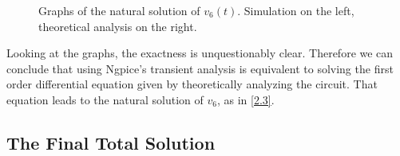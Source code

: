 \begin{figure}[h]
  \caption{\small Graphs of the natural solution of $v_6(t)$. Simulation on the left, theoretical analysis on the right.}
  \label{maquina}
\end{figure}

Looking at the graphs, the exactness is unquestionably clear. Therefore we can conclude that using Ngpice’s transient analysis is equivalent
to solving the first order differential equation given by theoretically analyzing the circuit. That equation leads to the natural solution of $v_6$, as in \ref{2.3}.


\subsection{The Final Total Solution} \label{3.4}

